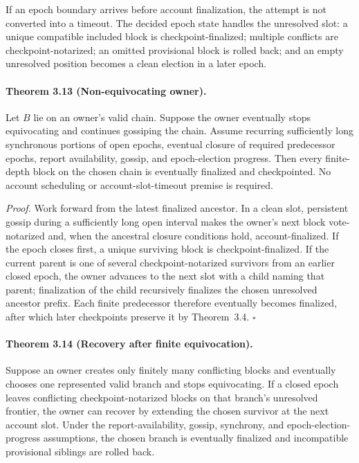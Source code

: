 \documentclass[10pt,twocolumn]{article}
\begin{document}
If an epoch boundary arrives before account finalization, the attempt is not converted into a timeout. The decided epoch state handles the unresolved slot: a unique compatible included block is checkpoint-finalized; multiple conflicts are checkpoint-notarized; an omitted provisional block is rolled back; and an empty unresolved position becomes a clean election in a later epoch.

\paragraph{Theorem 3.13 (Non-equivocating owner).} Let $B$ lie on an owner's valid chain. Suppose the owner eventually stops equivocating and continues gossiping the chain. Assume recurring sufficiently long synchronous portions of open epochs, eventual closure of required predecessor epochs, report availability, gossip, and epoch-election progress. Then every finite-depth block on the chosen chain is eventually finalized and checkpointed. No account scheduling or account-slot-timeout premise is required.

\emph{Proof.} Work forward from the latest finalized ancestor. In a clean slot, persistent gossip during a sufficiently long open interval makes the owner's next block vote-notarized and, when the ancestral closure conditions hold, account-finalized. If the epoch closes first, a unique surviving block is checkpoint-finalized. If the current parent is one of several checkpoint-notarized survivors from an earlier closed epoch, the owner advances to the next slot with a child naming that parent; finalization of the child recursively finalizes the chosen unresolved ancestor prefix. Each finite predecessor therefore eventually becomes finalized, after which later checkpoints preserve it by Theorem~3.4. $\square$

\paragraph{Theorem 3.14 (Recovery after finite equivocation).} Suppose an owner creates only finitely many conflicting blocks and eventually chooses one represented valid branch and stops equivocating. If a closed epoch leaves conflicting checkpoint-notarized blocks on that branch's unresolved frontier, the owner can recover by extending the chosen survivor at the next account slot. Under the report-availability, gossip, synchrony, and epoch-election-progress assumptions, the chosen branch is eventually finalized and incompatible provisional siblings are rolled back.
\end{document}
